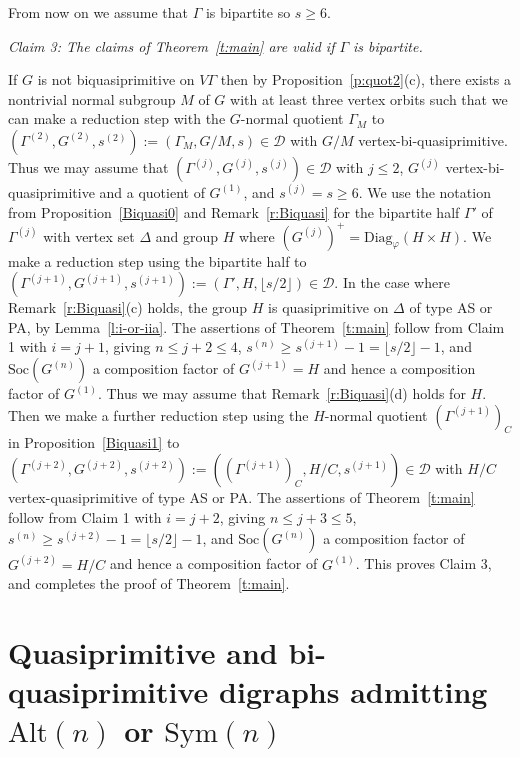 \documentclass[11pt]{amsart}
\newcommand{\Soc}{\mathrm{Soc}}
\newcommand\DD{{\mathscr{D}}}
\newcommand{\Diag}{\mathrm{Diag}}
\newcommand{\Sym}{\mathrm{Sym}}
\newcommand{\Alt}{\mathrm{Alt}}
\begin{document}
\smallskip
From now on we assume that $\Gamma$ is bipartite so $s\geqslant6$.

\smallskip\noindent
\emph{Claim 3: The claims of Theorem~\ref{t:main} are valid if $\Gamma$ is bipartite.} 

If $G$ is not biquasiprimitive on $V\Gamma$ then by  Proposition~\ref{p:quot2}(c), there exists a nontrivial normal subgroup $M$ of $G$ with at least three vertex orbits such that  we can make a reduction step with the $G$-normal quotient $\Gamma_M$ to    $(\Gamma^{(2)},G^{(2)},s^{(2)}) := (\Gamma_M,G/M,s)\in\DD$ with $G/M$ vertex-bi-quasiprimitive.  Thus we may assume that $(\Gamma^{(j)},G^{(j)},s^{(j)})\in\DD$ with $j\leqslant2$, $G^{(j)}$ vertex-bi-quasiprimitive and a quotient of $G^{(1)}$, and  $s^{(j)}=s\geqslant6$. We use the notation from Proposition~\ref{Biquasi0} and Remark~\ref{r:Biquasi} for the bipartite half $\Gamma'$ of $\Gamma^{(j)}$ with vertex set $\Delta$ and group $H$ where $(G^{(j)})^+=\Diag_\varphi(H\times H)$.  We make a reduction step using the bipartite half to $(\Gamma^{(j+1)},G^{(j+1)},s^{(j+1)}) := (\Gamma', H, \lfloor s/2\rfloor)\in\DD$. 
In the case where Remark~\ref{r:Biquasi}(c) holds, the group $H$ is quasiprimitive on $\Delta$ of type AS or PA, by Lemma~\ref{l:i-or-iia}.  
 The assertions of  Theorem~\ref{t:main} follow from Claim 1 with $i=j+1$, giving $n\leqslant j+2\leqslant 4$, $s^{(n)} \geqslant s^{(j+1)}-1=\lfloor s/2\rfloor -1$, and $\Soc(G^{(n)})$ a composition factor of $G^{(j+1)}=H$ and hence a composition factor of $G^{(1)}$.
%
Thus we may assume that Remark~\ref{r:Biquasi}(d) holds for $H$. Then we make a further reduction step using the $H$-normal quotient $(\Gamma^{(j+1)})_C$ in Proposition~\ref{Biquasi1} to $(\Gamma^{(j+2)},G^{(j+2)},s^{(j+2)}) :=((\Gamma^{(j+1)})_C,H/C,s^{(j+1)})\in\DD$ with $H/C$ vertex-quasiprimitive of type AS or PA. The assertions of  Theorem~\ref{t:main} follow from Claim 1 with $i=j+2$, giving $n\leqslant j+3\leqslant5$,  $s^{(n)} \geqslant s^{(j+2)}-1=\lfloor s/2\rfloor -1$, and $\Soc(G^{(n)})$ a composition factor of $G^{(j+2)}=H/C$ and hence a composition factor of $G^{(1)}$. This proves Claim 3, and completes the proof of Theorem~\ref{t:main}.


\section{Quasiprimitive and bi-quasiprimitive digraphs admitting $\Alt(n)$ or $\Sym(n)$}\label{Sec:Ex}
\end{document}
